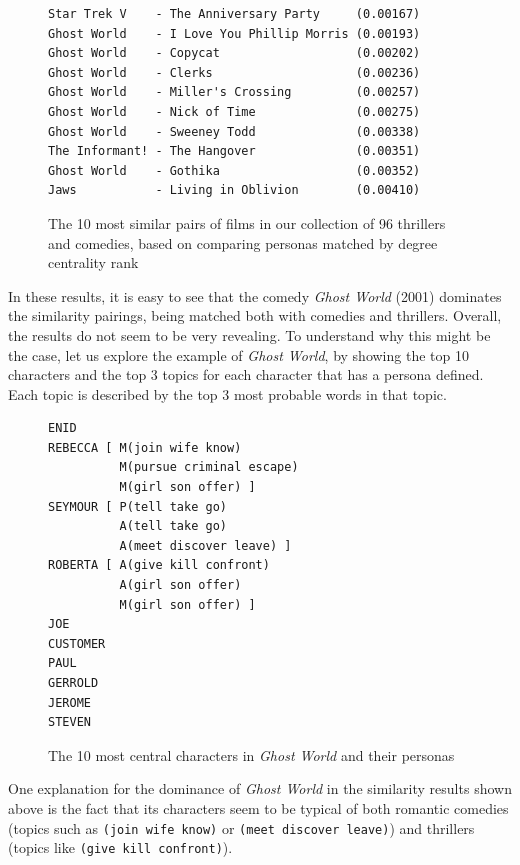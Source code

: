 \documentclass[bsc,frontabs,deptreport,singlespacing,parskip, twoside]{infthesis}
\begin{document}
\begin{figure}[h]
\centering
\begin{minipage}{11.5cm}
\begin{Verbatim}[frame=single]
Star Trek V    - The Anniversary Party     (0.00167)
Ghost World    - I Love You Phillip Morris (0.00193)
Ghost World    - Copycat                   (0.00202)
Ghost World    - Clerks                    (0.00236)
Ghost World    - Miller's Crossing         (0.00257)
Ghost World    - Nick of Time              (0.00275)
Ghost World    - Sweeney Todd              (0.00338)
The Informant! - The Hangover              (0.00351)
Ghost World    - Gothika                   (0.00352)
Jaws           - Living in Oblivion        (0.00410)
\end{Verbatim}
\end{minipage}
\caption{The 10 most similar pairs of films in our collection of 96 thrillers and comedies, based on comparing personas matched by degree centrality rank}
\end{figure}

In these results, it is easy to see that the comedy \textit{Ghost World} (2001) dominates the similarity pairings, being matched both with comedies and thrillers. Overall, the results do not seem to be very revealing. To understand why this might be the case, let us explore the example of \textit{Ghost World}, by showing the top 10 characters and the top 3 topics for each character that has a persona defined. Each topic is described by the top 3 most probable words in that topic.

\begin{figure}[h]
\centering
\begin{minipage}{9cm}
\begin{Verbatim}[frame=single]
ENID 
REBECCA [ M(join wife know)
          M(pursue criminal escape)
          M(girl son offer) ]
SEYMOUR [ P(tell take go)
          A(tell take go)
          A(meet discover leave) ]
ROBERTA [ A(give kill confront)
          A(girl son offer)
          M(girl son offer) ]
JOE 
CUSTOMER 
PAUL 
GERROLD 
JEROME 
STEVEN 
\end{Verbatim}

\end{minipage}
\caption{The 10 most central characters in \textit{Ghost World} and their personas}
\end{figure}

One explanation for the dominance of \textit{Ghost World} in the similarity results shown above is the fact that its characters seem to be typical of both romantic comedies (topics such as \texttt{(join wife know)} or \texttt{(meet discover leave)}) and thrillers (topics like \texttt{(give kill confront)}).
\end{document}
